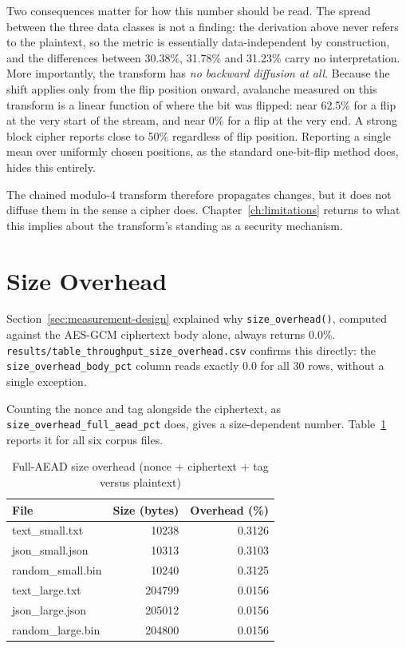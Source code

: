 \documentclass[12pt,a4paper,twoside]{report}
\numberwithin{equation}{chapter}
\begin{document}
Two consequences matter for how this number should be read. The spread
between the three data classes is not a finding: the derivation above
never refers to the plaintext, so the metric is essentially
data-independent by construction, and the differences between 30.38\%,
31.78\% and 31.23\% carry no interpretation. More importantly, the
transform has \emph{no backward diffusion at all}. Because the shift
applies only from the flip position onward, avalanche measured on this
transform is a linear function of where the bit was flipped: near 62.5\%
for a flip at the very start of the stream, and near 0\% for a flip at
the very end. A strong block cipher reports close to 50\% regardless of
flip position. Reporting a single mean over uniformly chosen positions,
as the standard one-bit-flip method does, hides this entirely.

The chained modulo-4 transform therefore propagates changes, but it does
not diffuse them in the sense a cipher does. Chapter~\ref{ch:limitations}
returns to what this implies about the transform's standing as a
security mechanism.

\section{Size Overhead}
\label{sec:results-overhead}
Section~\ref{sec:measurement-design} explained why \texttt{size\_overhead()},
computed against the AES-GCM ciphertext body alone, always returns
0.0\%. \texttt{results/table\_throughput\_size\_overhead.csv} confirms
this directly: the \texttt{size\_overhead\_body\_pct} column reads
exactly 0.0 for all 30 rows, without a single exception.

Counting the nonce and tag alongside the ciphertext, as
\texttt{size\_overhead\_full\_aead\_pct} does, gives a size-dependent number. Table~\ref{tab:overhead} reports it for all six
corpus files.

\begin{table}[h]
\centering
\caption{Full-AEAD size overhead (nonce + ciphertext + tag versus plaintext)}
\label{tab:overhead}
\begin{tabular}{lrr}
\toprule
File & Size (bytes) & Overhead (\%) \\
\midrule
text\_small.txt & 10238 & 0.3126 \\
json\_small.json & 10313 & 0.3103 \\
random\_small.bin & 10240 & 0.3125 \\
text\_large.txt & 204799 & 0.0156 \\
json\_large.json & 205012 & 0.0156 \\
random\_large.bin & 204800 & 0.0156 \\
\bottomrule
\end{tabular}
\end{table}
\end{document}
